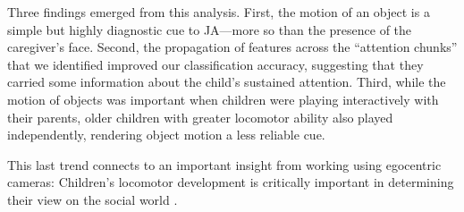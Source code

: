 \documentclass[10pt,letterpaper]{article}
\begin{document}
Three findings emerged from this analysis. First, the motion of an object is a simple but highly diagnostic cue to JA---more so than the presence of the caregiver's face. Second, the propagation of features across the ``attention chunks'' that we identified improved our classification accuracy, suggesting that they carried some information about the child's sustained attention. Third, while the motion of objects was important when children were playing interactively with their parents, older children with greater locomotor ability also played independently, rendering object motion a less reliable cue. 

This last trend connects to an important insight from working using egocentric cameras: Children's locomotor development is critically important in determining their view on the social world \cite{franchak2011,frank2013,kretch2013}.



\setlength{\bibleftmargin}{.125in}
\setlength{\bibindent}{-\bibleftmargin}



\end{document}
